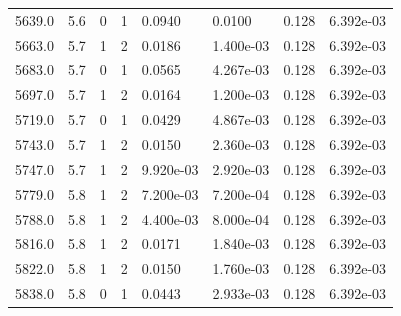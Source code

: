 \documentclass[preview]{standalone}
\begin{document}
{{{{{{{\begin{tabular}{L{1.2cm}C{1.2cm} C{0.3cm}C{0.5cm} C{1.4cm}C{1.4cm} C{1.4cm}C{1.4cm}}
  5639.0  &   5.6  & 0     &  1 &  0.0940  & 0.0100  & 0.128 &  6.392e-03   \\ 
  5663.0  &   5.7  & 1     &  2 &  0.0186  & 1.400e-03  & 0.128 &  6.392e-03   \\ 
  5683.0  &   5.7  & 0     &  1 &  0.0565  & 4.267e-03  & 0.128 &  6.392e-03   \\ 
  5697.0  &   5.7  & 1     &  2 &  0.0164  & 1.200e-03  & 0.128 &  6.392e-03   \\ 
  5719.0  &   5.7  & 0     &  1 &  0.0429  & 4.867e-03  & 0.128 &  6.392e-03   \\ 
  5743.0  &   5.7  & 1     &  2 &  0.0150  & 2.360e-03  & 0.128 &  6.392e-03   \\ 
  5747.0  &   5.7  & 1     &  2 &  9.920e-03  & 2.920e-03  & 0.128 &  6.392e-03   \\ 
  5779.0  &   5.8  & 1     &  2 &  7.200e-03  & 7.200e-04  & 0.128 &  6.392e-03   \\ 
  5788.0  &   5.8  & 1     &  2 &  4.400e-03  & 8.000e-04  & 0.128 &  6.392e-03   \\ 
  5816.0  &   5.8  & 1     &  2 &  0.0171  & 1.840e-03  & 0.128 &  6.392e-03   \\ 
  5822.0  &   5.8  & 1     &  2 &  0.0150  & 1.760e-03  & 0.128 &  6.392e-03   \\ 
  5838.0  &   5.8  & 0     &  1 &  0.0443  & 2.933e-03  & 0.128 &  6.392e-03   \\ 
\hline 
\end{tabular} 

}}}}}}}
\end{document}
